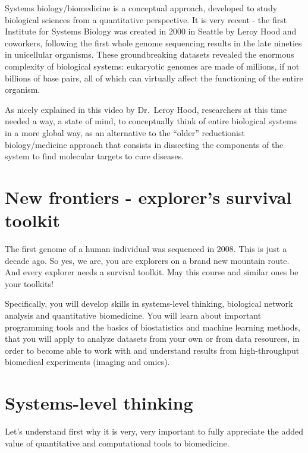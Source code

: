 \documentclass[
]{book}
\begin{document}
Systems biology/biomedicine is a conceptual approach, developed to study biological sciences from a quantitative perspective. It is very recent - the first Institute for Systems Biology was created in 2000 in Seattle by Leroy Hood and coworkers, following the first whole genome sequencing results in the late nineties in unicellular organisms. These groundbreaking datasets revealed the enormous complexity of biological systems: eukaryotic genomes are made of millions, if not billions of base pairs, all of which can virtually affect the functioning of the entire organism.

As nicely explained in this video by Dr.~Leroy Hood, researchers at this time needed a way, a state of mind, to conceptually think of entire biological systems in a more global way, as an alternative to the ``older'' reductionist biology/medicine approach that consists in dissecting the components of the system to find molecular targets to cure diseases.

\hypertarget{new-frontiers---explorers-survival-toolkit}{%
\section{New frontiers - explorer's survival toolkit}\label{new-frontiers---explorers-survival-toolkit}}

The first genome of a human individual was sequenced in 2008. This is just a decade ago. So yes, we are, you are explorers on a brand new mountain route. And every explorer needs a survival toolkit. May this course and similar ones be your toolkits!

Specifically, you will develop skills in systems-level thinking, biological network analysis and quantitative biomedicine. You will learn about important programming tools and the basics of biostatistics and machine learning methods, that you will apply to analyze datasets from your own or from data resources, in order to become able to work with and understand results from high-throughput biomedical experiments (imaging and omics).

\hypertarget{systems-level-thinking}{%
\section{Systems-level thinking}\label{systems-level-thinking}}

Let's understand first why it is very, very important to fully appreciate the added value of quantitative and computational tools to biomedicine.
\end{document}

